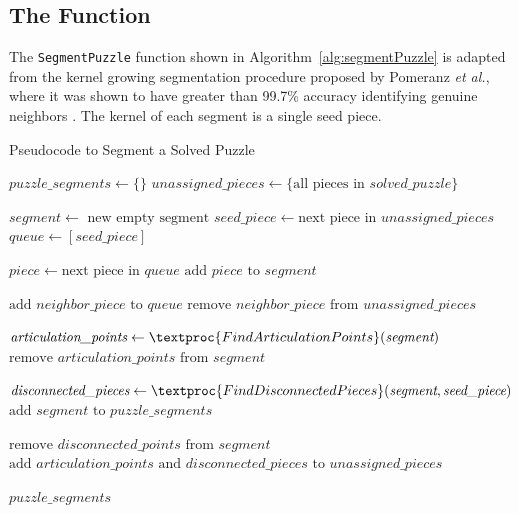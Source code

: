 \subsection{The  Function}\label{sec:segmentPuzzle}

The \texttt{SegmentPuzzle} function shown in Algorithm~\ref{alg:segmentPuzzle} is adapted from the kernel growing segmentation procedure proposed by Pomeranz \textit{et al.}, where it was shown to have greater than 99.7\% accuracy identifying genuine neighbors \cite{pomeranz2011}. The kernel of each segment is a single seed piece.

\begin{algorithm}[tb]
\caption{Pseudocode to Segment a Solved Puzzle}\label{alg:segmentPuzzle}
\begin{algorithmic}[1]
    \State $puzzle\_segments \gets \{ \}$
    \State $unassigned\_pieces \gets \{ \text{all pieces in } solved\_puzzle \}$
\item[]
        \State $segment \gets \text{ new empty segment}$
        \State $seed\_piece \gets \text{next piece in } unassigned\_pieces$
        \State $queue \gets [seed\_piece]$
\item[]
            \State $piece \gets \text{next piece in } queue$
            \State $\text{add } piece \text{ to } segment$
\item[]
            		\State $\text{add } neighbor\_piece \text{ to } \textit{queue}$
            		\State $\text{remove } neighbor\_piece \text{ from } unassigned\_pieces$
            	\EndIf
            \EndFor
        \EndWhile
\item[]
        \State $\textit{articulation\_points} \gets \textproc{FindArticulationPoints}(\textit{segment})$
        \State $\text{remove } \textit{articulation\_points} \text{ from } \textit{segment}$
\item[]
		\State $\textit{disconnected\_pieces} \gets \textproc{FindDisconnectedPieces}(\textit{segment},\textit{seed\_piece})$        
        \State $\text{add } segment \text{ to } puzzle\_segments$
\item[]
		\State $\text{remove } \textit{disconnected\_points} \text{ from } \textit{segment}$
        \State $\text{add } \textit{articulation\_points} \text{ and } \textit{disconnected\_pieces} \text{ to } \textit{unassigned\_pieces}$
    \EndWhile
\item[]
    \State \Return $\textit{puzzle\_segments}$
\EndFunction
\end{algorithmic}
\end{algorithm}

